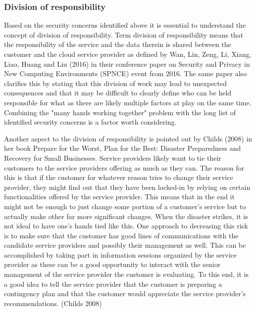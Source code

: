 \documentclass{article}
\begin{document}
\subsubsection{Division of responsibility}
Based on the security concerns identified above it is essential to understand the concept of division of responsibility.
Term division of responsibility means that the responsibility of the service and the data therein is shared between the customer and the cloud service provider as defined by Wan, Lin, Zeng, Li, Xiang, Liao, Huang and Liu (2016) in their conference paper on Security and Privacy in New Computing Environments (SPNCE) event from 2016.
The same paper also clarifies this by stating that this division of work may lead to unexpected consequences and that it may be difficult to clearly define who can be held responsible for what as there are likely multiple factors at play on the same time.
Combining the "many hands working together" problem with the long list of identified security concerns is a factor worth considering.
\par
Another aspect to the division of responsibility is pointed out by Childs (2008) in her book Prepare for the Worst, Plan for the Best: Disaster Preparedness and Recovery for Small Businesses. 
Service providers likely want to tie their customers to the service providers offering as much as they can. The reason for this is that if the customer for whatever reason tries to change their service provider, they might find out that they have been locked-in by relying on certain functionalities offered by the service provider. This means that in the end it might not be enough to just change some portion of a customer's service but to actually make other far more significant changes. When the disaster strikes, it is not ideal to have one's hands tied like this. One approach to decreasing this risk is to make sure that the customer has good lines of communications with the candidate service providers and possibly their management as well. This can be accomplished by taking part in information sessions organized by the service provider as these can be a good opportunity to interact with the senior management of the service provider the customer is evaluating. To this end, it is a good idea to tell the service provider that the customer is preparing a contingency plan and that the customer would appreciate the service provider's recommendations. (Childs 2008) 
\par
\end{document}
